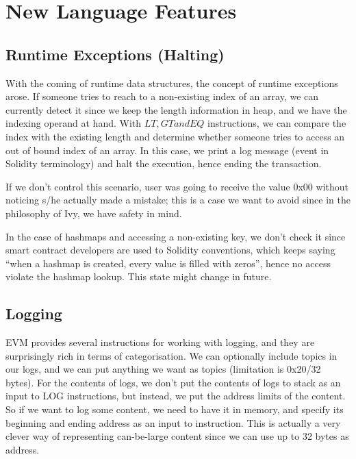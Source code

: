 \documentclass{article}
\begin{document}
\section{New Language Features}
\label{new-language-features}
\subsection{Runtime Exceptions (Halting)}
With the coming of runtime data structures, the concept of runtime exceptions arose. If someone tries to reach to a non-existing index of an array, we can currently detect it since we keep the length information in heap, and we have the indexing operand at hand. With $LT, GT and EQ$ instructions, we can compare the index with the existing length and determine whether someone tries to access an out of bound index of an array. In this case, we print a log message (event in Solidity terminology) and halt the execution, hence ending the transaction.

\par If we don't control this scenario, user was going to receive the value 0x00 without noticing s/he actually made a mistake; this is a case we want to avoid since in the philosophy of Ivy, we have safety in mind.

\par In the case of hashmaps and accessing a non-existing key, we don't check it since smart contract developers are used to Solidity conventions, which keeps saying ``when a hashmap is created, every value is filled with zeros'', hence no access violate the hashmap lookup. This state might change in future.
\label{runtime-exceptions}
\newpage
\subsection{Logging}
\label{logging}
\par EVM provides several instructions for working with logging, and they are surprisingly rich in terms of categorisation. We can optionally include topics in our logs, and we can put anything we want as topics (limitation is 0x20/32 bytes). For the contents of logs, we don't put the contents of logs to stack as an input to LOG instructions, but instead, we put the address limits of the content. So if we want to log some content, we need to have it in memory, and specify its beginning and ending address as an input to instruction. This is actually a very clever way of representing can-be-large content since we can use up to 32 bytes as address.
\end{document}
